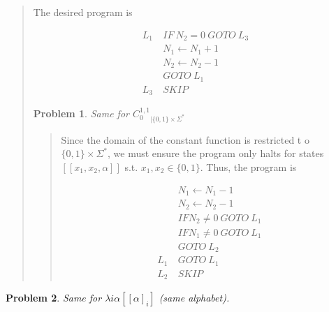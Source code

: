 \documentclass[a4paper, 12pt]{article}
\newtheorem{problem}{Problem}
\newtheorem{problem}{Problem}
\begin{document}
\small
\begin{quote}

The desired program is 

\begin{align*}
    L_1 ~ &IF ~ N_2 = 0 ~ GOTO ~ L_3 \\ 
          &N_1 \leftarrow N_1 + 1 \\ 
          &N_2 \leftarrow N_2 - 1 \\ 
          &GOTO ~ L_1\\
    L_3 ~ & SKIP
\end{align*}

\begin{problem}
    Same for $C_0^{1, 1}_{\mid \{0, 1\} \times  \Sigma^{*}}$
\end{problem}


\small
\begin{quote}


Since the domain of the constant function is restricted t o $\{0, 1\} \times
\Sigma^{*}$, we must ensure the program only halts for states $[\![ x_1, x_2,
\alpha ]\!]$ s.t. $x_1,x_2 \in \{0, 1\}$. Thus, the program is 

\begin{align*}
    &N_1 \leftarrow N_1 - 1 \\
    &N_2 \leftarrow N_2 - 1 \\
    &IF N_2 \neq 0 ~ GOTO ~ L_1 \\ 
    & IF N_1 \neq 0 ~ GOTO ~ L_1 \\ 
    &GOTO ~ L_2 \\ 
    L_1~& GOTO ~ L_1 \\ 
    L_2~ &SKIP
\end{align*}

\end{quote}
\normalsize

\end{quote}
\normalsize



\begin{problem}
    Same for $\lambda i\alpha[[\alpha]_i]$ (same alphabet).
\end{problem}
\end{document}
